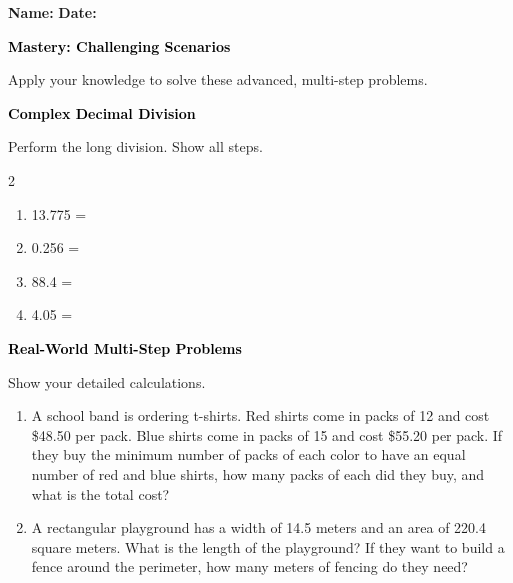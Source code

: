\documentclass[12pt, letterpaper, fleqn]{article}
\newcommand{\blank}{\underline{\hspace{2.2cm}}}
\begin{document}
\textbf{Name:} \underline{\hspace{5cm}}
\hfill
\textbf{Date:} \underline{\hspace{3cm}}\\

\begin{tcolorbox}[colback=customteal!20]
    \large\textcolor{black}{\textbf{Mastery: Challenging Scenarios}}
\end{tcolorbox}

\vspace{3mm}
\noindent
Apply your knowledge to solve these advanced, multi-step problems.

\vspace{4mm}

\begin{tcolorbox}[colback=customteal!20]
\large\textcolor{black}{\textbf{Complex Decimal Division}}
\end{tcolorbox}

\noindent
Perform the long division. Show all steps.

\vspace{3mm}
\begin{multicols}{2}
\begin{enumerate}[itemsep=1cm, leftmargin=0.6cm]
\item 13.775  = \blank
\item 0.256  = \blank
\item 88.4  = \blank
\item 4.05  = \blank
\end{enumerate}
\end{multicols}
\newpage

\begin{tcolorbox}[colback=customteal!20]
\large\textcolor{black}{\textbf{Real-World Multi-Step Problems}}
\end{tcolorbox}

\noindent
Show your detailed calculations.

\vspace{3mm}
\begin{enumerate}[itemsep=1.5cm, leftmargin=0.6cm]
\item A school band is ordering t-shirts. Red shirts come in packs of 12 and cost \$48.50 per pack. Blue shirts come in packs of 15 and cost \$55.20 per pack. If they buy the minimum number of packs of each color to have an equal number of red and blue shirts, how many packs of each did they buy, and what is the total cost?
\vspace{1.5cm}
\item A rectangular playground has a width of 14.5 meters and an area of 220.4 square meters. What is the length of the playground? If they want to build a fence around the perimeter, how many meters of fencing do they need?
\vspace{1.5cm}
\end{enumerate}
\newpage
\end{document}
